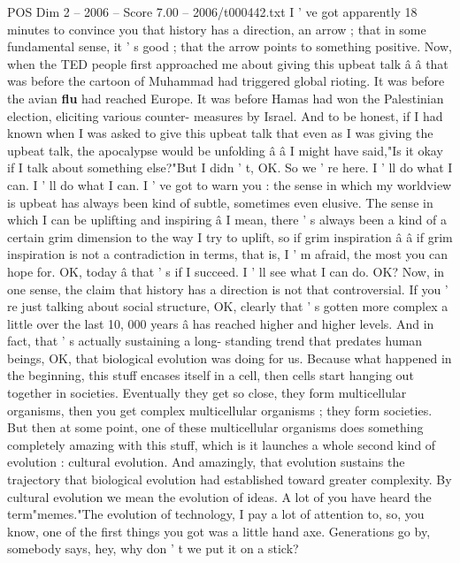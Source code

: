 \begin{textsample}{POS Dim 2 – 2006 – Score 7.00 – 2006/t000442.txt}  \label{ex:f2_pos_087}
I ' ve got apparently 18 minutes to convince you that history has a direction, an arrow ; that in some fundamental sense, it ' s good ; that the arrow points to something positive.
Now, when the TED people first approached me about giving this upbeat talk â â that was before the cartoon of Muhammad had triggered global rioting.
It was before the avian \textbf{flu} had reached Europe.
It was before Hamas had won the Palestinian election, eliciting various counter- measures by Israel.
And to be honest, if I had known when I was asked to give this upbeat talk that even as I was giving the upbeat talk, the apocalypse would be unfolding â â I might have said,"Is it okay if I talk about something else?"But I didn ' t, OK.
So we ' re here.
I ' ll do what I can.
I ' ll do what I can.
I ' ve got to warn you : the sense in which my worldview is upbeat has always been kind of subtle, sometimes even elusive.
The sense in which I can be uplifting and inspiring â I mean, there ' s always been a kind of a certain grim dimension to the way I try to uplift, so if grim inspiration â â if grim inspiration is not a contradiction in terms, that is, I ' m afraid, the most you can hope for.
OK, today â that ' s if I succeed.
I ' ll see what I can do.
OK?
Now, in one sense, the claim that history has a direction is not that controversial.
If you ' re just talking about social structure, OK, clearly that ' s gotten more complex a little over the last 10, 000 years â has reached higher and higher levels.
And in fact, that ' s actually sustaining a long- standing trend that predates human beings, OK, that biological evolution was doing for us.
Because what happened in the beginning, this stuff encases itself in a cell, then cells start hanging out together in societies.
Eventually they get so close, they form multicellular organisms, then you get complex multicellular organisms ; they form societies.
But then at some point, one of these multicellular organisms does something completely amazing with this stuff, which is it launches a whole second kind of evolution : cultural evolution.
And amazingly, that evolution sustains the trajectory that biological evolution had established toward greater complexity.
By cultural evolution we mean the evolution of ideas.
A lot of you have heard the term"memes."The evolution of technology, I pay a lot of attention to, so, you know, one of the first things you got was a little hand axe.
Generations go by, somebody says, hey, why don ' t we put it on a stick?

\end{textsample}
